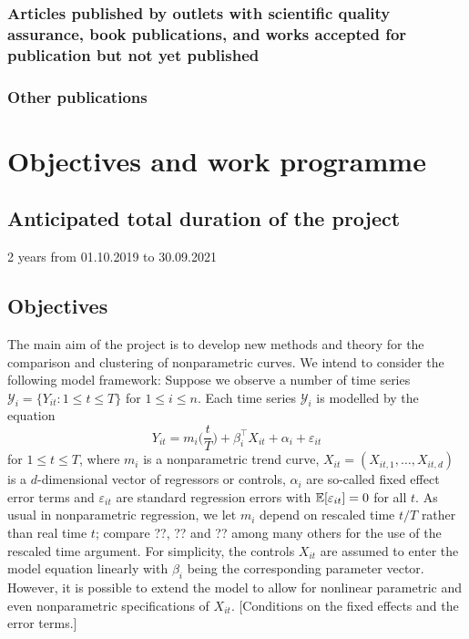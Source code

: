 \documentclass[a4paper,12pt]{article}
\begin{document}
\subsubsection{Articles published by outlets with scientific quality assurance, book publications, and works accepted for publication but not yet published}

\subsubsection{Other publications}

\section{Objectives and work programme}

\subsection{Anticipated total duration of the project}

2 years from 01.10.2019 to 30.09.2021



\subsection{Objectives}


The main aim of the project is to develop new methods and theory for the comparison and clustering of nonparametric curves. We intend to consider the following model framework: Suppose we observe a number of time series $\mathcal{Y}_i = \{ Y_{it}: 1 \le t \le T \}$ for $1 \le i \le n$. Each time series $\mathcal{Y}_i$ is modelled by the equation
\begin{equation}\label{model-objectives}
Y_{it} = m_i \Big( \frac{t}{T} \Big) + \beta_i^\top X_{it} + \alpha_i + \varepsilon_{it}
\end{equation}
for $1 \le t \le T$, where $m_i$ is a nonparametric trend curve, $X_{it} = (X_{it,1},\ldots,X_{it,d})$ is a $d$-dimensional vector of regressors or controls, $\alpha_i$ are so-called fixed effect error terms and $\varepsilon_{it}$ are standard regression errors with $\mathbb{E}[\varepsilon_{it}] = 0$ for all $t$. As usual in nonparametric regression, we let $m_i$ depend on rescaled time $t/T$ rather than real time $t$; compare ??, ?? and ?? among many others for the use of the rescaled time argument. For simplicity, the controls $X_{it}$ are assumed to enter the model equation linearly with $\beta_i$ being the corresponding parameter vector. However, it is possible to extend the model to allow for nonlinear parametric and even nonparametric specifications of $X_{it}$. [Conditions on the fixed effects and the error terms.] 
\end{document}

